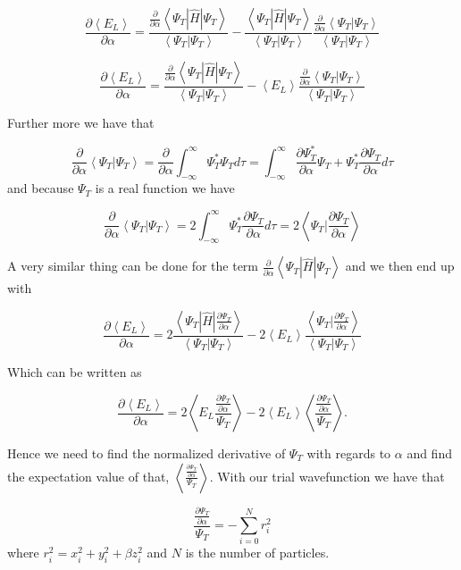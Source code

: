 $$ \frac{\partial \left< E_L \right>}{\partial \alpha} = \frac{\frac{\partial}{\partial \alpha}\left<\Psi_T | \hat{H}|\Psi_T\right>}{\left<\Psi_T|\Psi_T\right>}- \frac{\left< \Psi_T | \hat{H}|\Psi_T\right>}{\left<\Psi_T|\Psi_T\right>} \frac{\frac{\partial}{\partial \alpha}\left<\Psi_T|\Psi_T\right>}{\left<\Psi_T|\Psi_T\right>} $$ 

$$ \frac{\partial \left< E_L \right>}{\partial \alpha} = \frac{\frac{\partial}{\partial \alpha}\left<\Psi_T | \hat{H}|\Psi_T\right>}{\left<\Psi_T|\Psi_T\right>}- \left< E_L \right>\frac{\frac{\partial}{\partial \alpha}\left<\Psi_T|\Psi_T\right>}{\left<\Psi_T|\Psi_T\right>} $$ 

Further more we have that 

$$ \frac{\partial}{\partial \alpha}\left<\Psi_T|\Psi_T\right> =  \frac{\partial}{\partial \alpha}\int_{-\infty}^{\infty}\Psi_T^*\Psi_T d\tau =  \int_{-\infty}^{\infty}\frac{\partial \Psi_T^*}{\partial \alpha}\Psi_T + \Psi_T^*\frac{\partial \Psi_T}{\partial \alpha} d\tau $$ 
and because $\Psi_T$ is a real function we have

$$ \frac{\partial}{\partial \alpha}\left<\Psi_T|\Psi_T\right> = 2 \int_{-\infty}^{\infty}\Psi_T^*\frac{\partial \Psi_T}{\partial \alpha} d\tau = 2 \left<\Psi_T|\frac{\partial \Psi_T}{\partial \alpha}\right> $$ 

A very similar thing can be done for the term $\frac{\partial}{\partial \alpha}\left<\Psi_T | \hat{H}|\Psi_T\right>$ and we then end up with

$$ \frac{\partial \left< E_L \right>}{\partial \alpha} = 2\frac{\left<\Psi_T | \hat{H}|\frac{\partial\Psi_T}{\partial \alpha}\right>}{\left<\Psi_T|\Psi_T\right>}- 2\left< E_L \right>\frac{\left<\Psi_T|\frac{\partial\Psi_T}{\partial \alpha}\right>}{\left<\Psi_T|\Psi_T\right>}$$

Which can be written as

$$ \frac{\partial \left< E_L \right>}{\partial \alpha} = 2\left< E_L \frac{\frac{\partial \Psi_T}{\partial \alpha}}{\Psi_T}\right>- 2\left< E_L \right>\left<\frac{\frac{\partial \Psi_T}{\partial \alpha}}{\Psi_T}\right>. $$  

Hence we need to find the normalized derivative of $\Psi_T$ with regards to $\alpha$ and find the expectation value of that, $\left<\frac{\frac{\partial \Psi_T}{\partial \alpha}}{\Psi_T}\right>$. With our trial wavefunction we have that

$$\frac{\frac{\partial \Psi_T}{\partial \alpha}}{\Psi_T} = -\sum_{i=0}^N r_i^2$$ where $r_i^2 = x_i^2 + y_i^2 + \beta z_i^2$ and $N$ is the number of particles.

